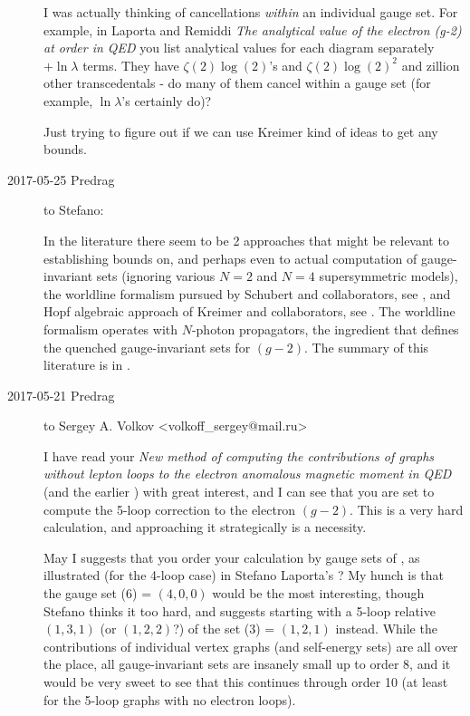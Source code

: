 \begin{description}
I was actually thinking of cancellations \emph{within} an individual
gauge set.  For example, in
Laporta and Remiddi
{\em The analytical value of the electron (g-2) at order in QED}
you list analytical values for each diagram separately $+\ln\lambda$
terms. They have $\zeta(2)\log(2)$'s and $\zeta(2)\log(2)^2$ and zillion
other transcedentals - do many of them cancel within a gauge set (for
example, $\ln\lambda$'s certainly do)?

Just trying to figure out if we can use Kreimer kind of ideas to get any
bounds.

\item[2017-05-25 Predrag] to Stefano:

In the literature there seem to be 2 approaches that might be relevant to
establishing bounds on, and perhaps even to actual computation of
gauge-invariant sets
(ignoring various $N=2$ and $N=4$ supersymmetric models),
the worldline formalism pursued by Schubert and
collaborators, see ,
and Hopf algebraic approach of Kreimer and
collaborators, see .
The worldline formalism operates with $N$-photon propagators, the ingredient
that defines the quenched gauge-invariant sets for $(g-2)$. The summary
of this literature is in .

\item[2017-05-21 Predrag] to
Sergey  A. Volkov <volkoff\_sergey@mail.ru>
%

I have read your
{\em New method of computing the contributions of graphs without lepton
loops to the electron anomalous magnetic moment in {QED}}
(and the earlier ) with great interest, and I can see
that you are set to compute the 5-loop correction to the electron
$(g-2)$. This is a very hard calculation, and approaching it
strategically is a necessity.

May I suggests that you order your calculation by gauge sets of
, as illustrated (for the 4-loop case) in Stefano
Laporta's ? My hunch is that the gauge
set (6) = $(4,0,0)$ would be the most interesting, though Stefano thinks
it too hard, and suggests starting with a 5-loop relative $(1,3,1)$ (or
$(1,2,2)$?) of the set (3) = $(1,2,1)$ instead. While the contributions
of individual vertex graphs (and self-energy sets) are all
over the place, all gauge-invariant sets are insanely small up to order
8, and it would be very sweet to see that this continues through order 10
(at least for the 5-loop graphs with no electron loops).


\end{description}
